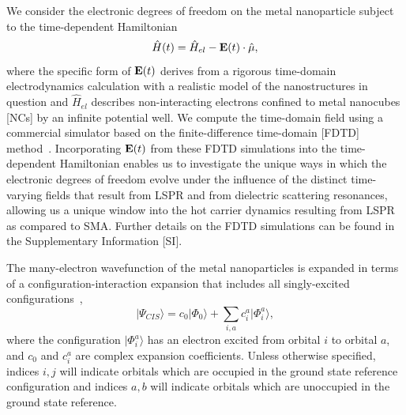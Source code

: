 \documentclass[journal=jpclcd,manuscript=article]{achemso}
\begin{document}
We consider the electronic degrees of freedom on the metal nanoparticle subject to the time-dependent Hamiltonian 
\begin{equation}\label{eq:TDHam}
\hat{H}(t) = \hat{H}_{el} - {\bf E}(t) \cdot \hat{\mu}, 
\end{equation}
where the specific form of ${\bf E}(t)$ derives from a rigorous time-domain electrodynamics calculation with a realistic model
of the nanostructures in question and $\hat{H}_{el}$ describes non-interacting electrons confined to metal nanocubes [NCs] by an infinite potential well.  
We compute the time-domain field 
using a commercial simulator based on the finite-difference time-domain [FDTD] method~\cite{Lumerical}.  
Incorporating  ${\bf E}(t)$ from these FDTD simulations into the time-dependent Hamiltonian enables us to investigate the unique ways
in which the electronic degrees of freedom evolve under the influence of the distinct time-varying fields that result
from LSPR and from dielectric scattering resonances, allowing us a unique window into the hot carrier dynamics resulting from LSPR as compared
to SMA.  Further details on the FDTD simulations can be found in the Supplementary Information [SI]. 

The many-electron wavefunction of the metal nanoparticles is expanded in terms of a configuration-interaction expansion that
includes all singly-excited configurations~\cite{Szabo},
\begin{equation}\label{eq:CIS}
|\Psi_{CIS}\rangle = c_0 |\Phi_0 \rangle + \sum_{i,a} c_i^a |\Phi_i^a\rangle,
\end{equation}
where the configuration $|\Phi_i^a\rangle$ has an electron excited from orbital $i$ to orbital $a$, 
and $c_0$ and $c_i^a$ are complex expansion coefficients.  Unless otherwise specified, indices $i, j$ will indicate
orbitals which are occupied in the ground state reference configuration and indices $a, b$ will indicate orbitals
which are unoccupied in the ground state reference.  
\end{document}
